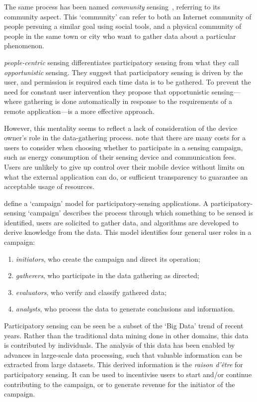 The same process has been named \emph{community} sensing~\citep{Krause2008},
referring to its community aspect. This `community' can refer to both an
Internet community of people persuing a similar goal using social tools, and a
physical community of people in the same town or city who want to gather data
about a particular phenomenon.

 \emph{people-centric} sensing differentiates
participatory sensing from what they call \emph{opportunistic} sensing. They
suggest that participatory sensing is driven by the user, and permission is
required each time data is to be gathered. To prevent the need for constant
user intervention they propose that opportunistic sensing---where gathering is
done automatically in response to the requirements of a remote 
application---is a more effective approach. 

However, this mentality seems to reflect a lack of consideration of the device
owner's role in the data-gathering process. \citet{BuckinghamShum2012} note
that there are many costs for a users to consider when choosing whether to
participate in a sensing campaign, such as energy consumption of their sensing
device and communication fees. Users are unlikely to give up control over
their mobile device without limits on what the external application can do, or
sufficient transparency to guarantee an acceptable usage of resources.

\citet{Burke2006} define a `campaign' model for participatory-sensing
applications. A participatory-sensing `campaign' describes the process through
which something to be sensed is identified, users are solicited to gather
data, and algorithms are developed to derive knowledge from the data. This
model identifies four general user roles in a campaign:

\begin{enumerate}
\item \emph{initiators}, who create the campaign and direct its operation;
\item \emph{gatherers}, who participate in the data gathering as directed;
\item \emph{evaluators}, who verify and classify gathered data;
\item \emph{analysts}, who process the data to generate conclusions and information.
\end{enumerate}

Participatory sensing can be seen be a subset of the `Big Data' trend of
recent years. Rather than the traditional data mining done in other domains,
this data is contributed by individuals. The analysis of this data has been
enabled by advances in large-scale data processing, such that valuable information
can be extracted from large datasets. This derived information is the
\emph{raison d'\^{e}tre} for participatory sensing. It can be used to
incentivise users to start and/or continue contributing to the campaign, or to
generate revenue for the initiator of the campaign.

